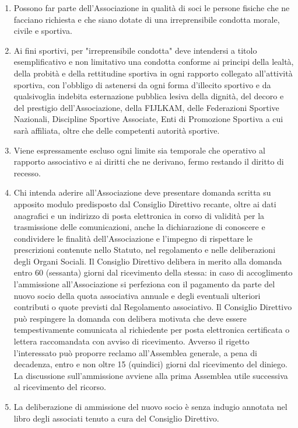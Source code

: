 \documentclass{djtsasddoc}
\begin{document}
	\begin{enumerate}
		\item Possono far parte dell'Associazione in qualità di soci le persone fisiche che ne facciano richiesta e che siano dotate di una irreprensibile condotta morale, civile e sportiva.
		\item Ai fini sportivi, per "irreprensibile condotta" deve intendersi a titolo esemplificativo e non limitativo una condotta conforme ai principi della lealtà, della probità e della rettitudine sportiva in ogni rapporto collegato all'attività sportiva, con l'obbligo di astenersi da ogni forma d'illecito sportivo e da qualsivoglia indebita esternazione pubblica lesiva della dignità, del decoro e del prestigio dell'Associazione,  della \mbox{FIJLKAM}, delle Federazioni Sportive Nazionali, Discipline Sportive Associate, Enti di Promozione Sportiva a cui sarà affiliata, oltre che delle competenti autorità sportive.
		\item Viene espressamente escluso ogni limite sia temporale che operativo al rapporto associativo e ai diritti che ne derivano, fermo restando il diritto di recesso.
		\item Chi intenda aderire all'Associazione deve presentare domanda scritta su apposito modulo predisposto dal  Consiglio Direttivo recante, oltre ai dati anagrafici e un indirizzo di posta elettronica  in corso di validità per la trasmissione delle comunicazioni, anche la dichiarazione di conoscere e condividere le finalità dell'Associazione e l'impegno di rispettare le prescrizioni contenute nello Statuto, nel  regolamento e nelle deliberazioni degli Organi Sociali.  Il Consiglio Direttivo delibera in merito alla domanda entro 60 (sessanta) giorni dal ricevimento della stessa: in caso di accoglimento l'ammissione all'Associazione  si perfeziona con il pagamento da parte del nuovo socio della quota associativa annuale e degli eventuali ulteriori contributi o quote previsti dal Regolamento associativo.   Il Consiglio Direttivo può respingere la domanda con delibera motivata che deve essere  tempestivamente comunicata al richiedente per posta elettronica certificata  o lettera raccomandata con avviso di ricevimento. Avverso il rigetto l'interessato può proporre reclamo  all'Assemblea generale, a pena di decadenza, entro e non oltre 15  (quindici) giorni dal ricevimento del diniego. La discussione sull'ammissione avviene alla prima Assemblea utile successiva al ricevimento del ricorso.
		\item La deliberazione di ammissione del nuovo socio è senza indugio annotata nel libro degli associati tenuto a cura del Consiglio Direttivo.

\end{enumerate}
\end{document}
